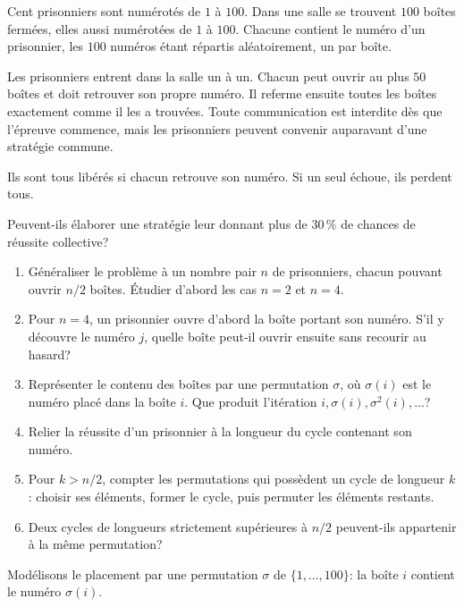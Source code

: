\documentclass[11pt,a4paper]{article}
\begin{document}

\begin{statementbox}
Cent prisonniers sont numérotés de $1$ à $100$. Dans une salle se trouvent
$100$ boîtes fermées, elles aussi numérotées de $1$ à $100$. Chacune contient
le numéro d'un prisonnier, les $100$ numéros étant répartis aléatoirement, un
par boîte.

Les prisonniers entrent dans la salle un à un. Chacun peut ouvrir au plus
$50$ boîtes et doit retrouver son propre numéro. Il referme ensuite toutes les
boîtes exactement comme il les a trouvées. Toute communication est interdite
dès que l'épreuve commence, mais les prisonniers peuvent convenir auparavant
d'une stratégie commune.

Ils sont tous libérés si chacun retrouve son numéro. Si un seul échoue, ils
perdent tous.

Peuvent-ils élaborer une stratégie leur donnant plus de $30\,\%$ de chances
de réussite collective?
\end{statementbox}

\begin{hintsbox}
\begin{enumerate}
  \item Généraliser le problème à un nombre pair $n$ de prisonniers, chacun
  pouvant ouvrir $n/2$ boîtes. Étudier d'abord les cas $n=2$ et $n=4$.
  \item Pour $n=4$, un prisonnier ouvre d'abord la boîte portant son numéro.
  S'il y découvre le numéro $j$, quelle boîte peut-il ouvrir ensuite sans
  recourir au hasard?
  \item Représenter le contenu des boîtes par une permutation $\sigma$, où
  $\sigma(i)$ est le numéro placé dans la boîte $i$. Que produit l'itération
  $i,\sigma(i),\sigma^2(i),\ldots$?
  \item Relier la réussite d'un prisonnier à la longueur du cycle contenant
  son numéro.
  \item Pour $k>n/2$, compter les permutations qui possèdent un cycle de
  longueur $k$: choisir ses éléments, former le cycle, puis permuter les
  éléments restants.
  \item Deux cycles de longueurs strictement supérieures à $n/2$ peuvent-ils
  appartenir à la même permutation?
\end{enumerate}
\end{hintsbox}

\correction

Modélisons le placement par une permutation $\sigma$ de
$\{1,\ldots,100\}$: la boîte $i$ contient le numéro $\sigma(i)$.
\end{document}
